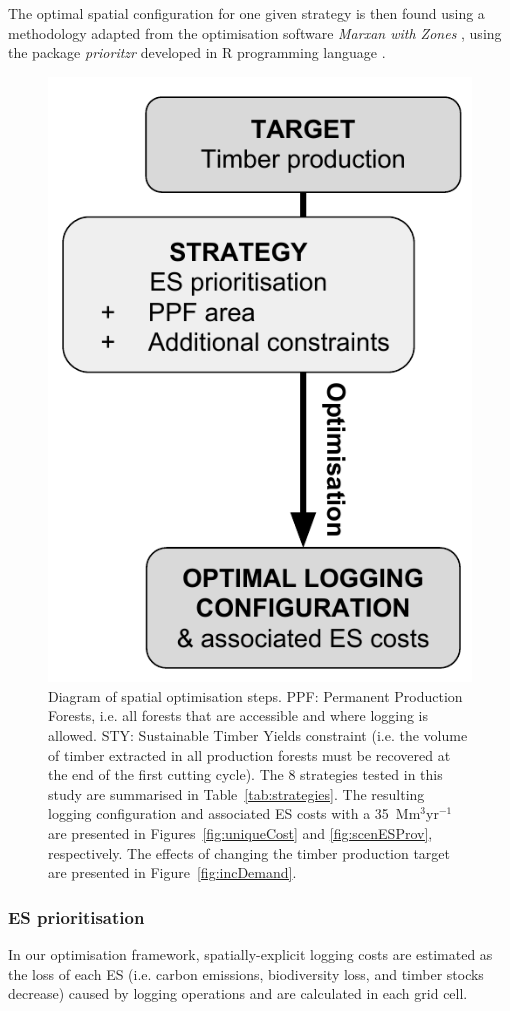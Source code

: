 \documentclass{article}
\begin{document}
The optimal spatial configuration for one given strategy is then found using a methodology adapted from the optimisation software \textit{Marxan with Zones} \cite{Watts2009}, using the package \textit{prioritzr} \cite{Hanson2018} developed in R programming language \cite{RCoreTeam2017}. 

\begin{figure}
    \centering
    \includegraphics[width = 0.6\linewidth]{graphs/diagramSpatOptim}
    \caption{Diagram of spatial optimisation steps. PPF: Permanent Production Forests, i.e. all forests that are accessible and where logging is allowed. STY: Sustainable Timber Yields constraint (i.e. the volume of timber extracted in all production forests must be recovered at the end of the first cutting cycle). The 8 strategies tested in this study are summarised in Table~\ref{tab:strategies}. The resulting logging configuration and associated ES costs with a 35~Mm$^3$yr$^{-1}$ are presented in Figures~\ref{fig:uniqueCost} and \ref{fig:scenESProv}, respectively. The effects of changing the timber production target are presented in Figure~\ref{fig:incDemand}.}
    \label{fig:basicDiagram}
\end{figure}

\subsubsection{ES prioritisation}
\label{sec:defPPF}

In our optimisation framework, spatially-explicit logging costs are estimated as the loss of each ES (i.e. carbon emissions, biodiversity loss, and timber stocks decrease) caused by logging operations and are calculated in each grid cell.
\end{document}
